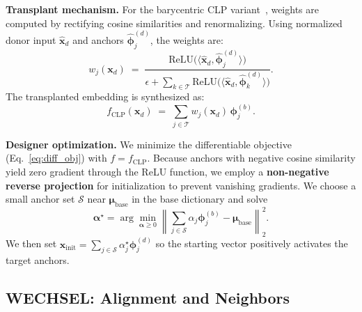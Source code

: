 \noindent\textbf{Transplant mechanism.}
For the barycentric CLP variant~\citep{ostendorff2023efficient}, weights are computed by rectifying cosine similarities and renormalizing.
Using normalized donor input $\widehat{\mathbf{x}}_d$ and anchors $\widehat{\boldsymbol{\phi}}^{(d)}_j$, the weights are:
\begin{equation}
\label{eq:clp_w}
w_j(\mathbf{x}_d)
\;=\;
\frac{\mathrm{ReLU}\!\big(\langle \widehat{\mathbf{x}}_d, \widehat{\boldsymbol{\phi}}^{(d)}_j\rangle\big)}
{\epsilon + \sum_{k\in\mathcal{T}} \mathrm{ReLU}\!\big(\langle \widehat{\mathbf{x}}_d, \widehat{\boldsymbol{\phi}}^{(d)}_k\rangle\big)}.
\end{equation}
The transplanted embedding is synthesized as:
\begin{equation}
\label{eq:clp_func}
f_{\text{CLP}}(\mathbf{x}_d)
\;=\;
\sum_{j\in\mathcal{T}} w_j(\mathbf{x}_d)\,\boldsymbol{\phi}^{(b)}_j.
\end{equation}

\noindent\textbf{Designer optimization.}
We minimize the differentiable objective (Eq.~\ref{eq:diff_obj}) with $f=f_{\text{CLP}}$.
Because anchors with negative cosine similarity yield zero gradient through the ReLU function, we employ a \textbf{non-negative reverse projection} for initialization to prevent vanishing gradients.
We choose a small anchor set $\mathcal{S}$ near $\boldsymbol{\mu}_{\text{base}}$ in the base dictionary and solve
\[
\boldsymbol{\alpha}^\star
=
\arg\min_{\boldsymbol{\alpha}\ge 0}
\left\|\sum_{j\in\mathcal{S}}\alpha_j\boldsymbol{\phi}^{(b)}_j-\boldsymbol{\mu}_{\text{base}}\right\|_2^2.
\]
We then set $\mathbf{x}_{\text{init}}=\sum_{j\in\mathcal{S}}\alpha^\star_j\boldsymbol{\phi}^{(d)}_j$ so the starting vector positively activates the target anchors.

\subsection{WECHSEL: Alignment and Neighbors}
\label{sec:wechsel-breaker}

